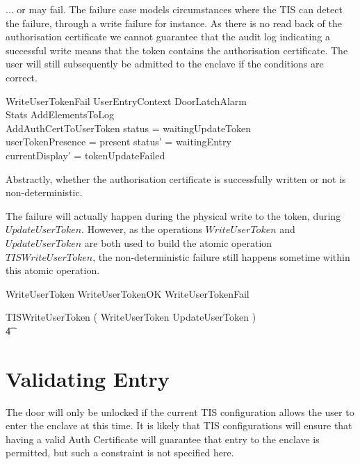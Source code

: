 ... or may fail. The failure case models circumstances where the TIS
can detect the failure, through a write failure for instance. 
As there is no read back of the authorisation certificate we cannot
guarantee that the audit log indicating a successful write means that
the token contains the authorisation certificate. The user will still
subsequently be admitted to the enclave if the conditions are correct. 

\begin{schema}{WriteUserTokenFail}
	UserEntryContext
\also
	\Xi DoorLatchAlarm
\\      \Xi Stats
\also
        AddElementsToLog
\\      AddAuthCertToUserToken
\where
	status = waitingUpdateToken
\\      userTokenPresence = present
\also
        status' = waitingEntry
\\      currentDisplay' = tokenUpdateFailed
\end{schema}


Abstractly, whether the authorisation certificate is successfully
written or not is non-deterministic.   

The failure will actually happen during the physical write to the
token, during $UpdateUserToken$. However, as the
operations $WriteUserToken$ and $UpdateUserToken$ are both used to
build the atomic operation $TISWriteUserToken$, the non-deterministic 
failure still happens sometime within this atomic operation.

\begin{zed}
WriteUserToken  WriteUserTokenOK \lor WriteUserTokenFail
\end{zed}

\begin{zed}
        TISWriteUserToken  (
        WriteUserToken \semi UpdateUserToken )
\\ \t4          \lor [~ UserTokenTorn | status = waitingUpdateToken ~] 
\end{zed}



\section{Validating Entry}

The door will only be unlocked if the current TIS configuration allows
the user to enter the enclave at this time. It is likely that TIS
configurations will ensure that having a valid Auth Certificate will
guarantee that entry to the enclave is permitted, but such a
constraint is not specified here. 

